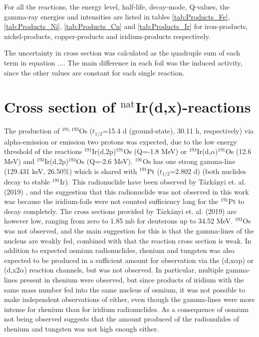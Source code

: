 For all the reactions, the energy level, half-life, decay-mode, Q-values, the gamma-ray energies and intensities are listed in tables \ref{tab:Products_Fe}, \ref{tab:Products_Ni}, \ref{tab:Products_Cu} and \ref{tab:Products_Ir} for iron-products, nickel-products, copper-products and iridium-products respectively. 

The uncertainty in cross section was calculated as the quadruple sum of each term in equation .... The main difference in each foil was the induced activity, since the other values are constant for each single reaction. 


\section{Cross section of $^\text{nat}$Ir(d,x)-reactions} \label{sec:ir_crossSections}

The production of $^{191,193}$Os ($t_{1/2}$=15.4 d (ground-state), 30.11 h, respectively) \cite{Vanin2007, ShamsuzzohaBasunia2017a} via alpha-emission or emission two protons was expected, due to the low energy threshold of the reactions $^{191}$Ir(d,2p)$^{191}$Os (Q=-1.8 MeV) or $^{193}$Ir(d,$\alpha$)$^{191}$Os (12.6 MeV) and $^{193}$Ir(d,2p)$^{193}$Os (Q=-2.6 MeV)\cite{PritychenkoB.SonzogniA.NNDC}. $^{191}$Os has one strong gamma-line (129.431 keV, 26.50\%) which is shared with $^{191}$Pt ($t_{1/2}$=2.802 d) (both nuclides decay to stable $^{191}$Ir)\cite{Vanin2007}. This radionuclide have been observed by Tárkányi et. al. (2019) \cite{Tarkanyi2019}, and the suggestion that this radionuclide was not observed in this work was because the iridium-foils were not counted sufficiency long for the $^{191}$Pt to decay completely. The cross sections provided by Tárkányi et. al. (2019) are however low, ranging from zero to 1.85 mb for deuterons up to 34.52 MeV. $^{193}$Os was not observed, and the main suggestion for this is that the gamma-lines of the nucleus are weakly fed, combined with that the reaction cross section is weak. In addition to expected osmium radionuclides, rhenium and tungsten was also expected to be produced in a sufficient amount for observation via the (d,x$\alpha$p) or (d,x$2\alpha$) reaction channels, but was not observed. In particular, multiple gamma-lines present in rhenium were observed, but since products of iridium with the same mass number fed into the same nucleus of osmium, it was not possible to make independent observations of either, even though the gamma-lines were more intense for rhenium than for iridium radionuclides. As a consequence of osmium not being observed suggests that the amount produced of the radionulides of rhenium and tungsten was not high enough either. \\

